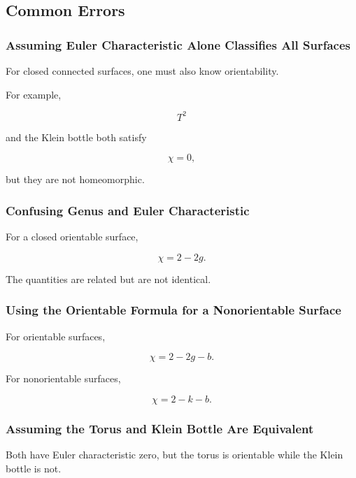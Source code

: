 \subsection{Common Errors}
\label{subsec:low-dimensional-common-errors}

\subsubsection{Assuming Euler Characteristic Alone Classifies All Surfaces}

For closed connected surfaces, one must also know orientability.

For example,

\[
T^2
\]

and the Klein bottle both satisfy

\[
\chi=0,
\]

but they are not homeomorphic.

\subsubsection{Confusing Genus and Euler Characteristic}

For a closed orientable surface,

\[
\chi=2-2g.
\]

The quantities are related but are not identical.

\subsubsection{Using the Orientable Formula for a Nonorientable Surface}

For orientable surfaces,

\[
\chi=2-2g-b.
\]

For nonorientable surfaces,

\[
\chi=2-k-b.
\]

\subsubsection{Assuming the Torus and Klein Bottle Are Equivalent}

Both have Euler characteristic zero, but the torus is orientable while the
Klein bottle is not.

